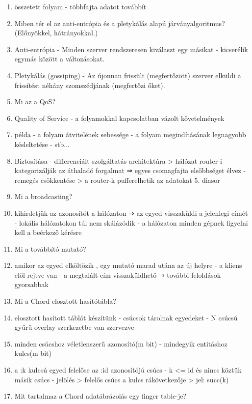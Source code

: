 \documentclass[twoside, a4paper, 12pt]{article}
\begin{document}
\begin{enumerate}
    \item összetett folyam
        - többfajta adatot továbbít
    \item  Miben tér el az anti-entrópia és a pletykálás alapú járványalgoritmus? (Előnyökkel, hátrányokkal.)
    \item Anti-entrópia
        - Minden szerver rendszeresen kiválaszt egy másikat
        - kicserélik egymás között a változásokat.
    \item Pletykálás (gossiping)
        - Az újonnan frissült (megfertőzött) szerver elküldi a frissítést néhány szomszédjának (megfertőzi őket).
    \item  Mi az a QoS?
    \item Quality of Service 
        - a folyamokkal kapcsolatban vázolt követelmények
    \item példa
        - a folyam átvitelének sebessége
        - a folyam megindításának legnagyobb késleltetése
        - stb...
    \item Biztosítása
        - differenciált szolgáltatás architektúra
        > hálózat router-i kategorizálják az áthaladó forgalmat 
        ⇒ egyes csomagfajta elsőbbséget élvez
        - remegés csökkentése
        > a router-k pufferelhetik az adatokat
        5. diasor
    \item  Mi a broadcasting?
    \item kihirdetjük az azonosítót a hálózaton ⇒ az egyed visszaküldi a jelenlegi címét
        - lokális hálózatokon túl nem skálázódik
        - a hálózaton minden gépnek figyelni kell a beérkező kérésre 
    \item  Mi a továbbító mutató?
    \item amikor az egyed elköltözik , egy mutató marad utána az új helyre
        - a kliens elől rejtve van
        - a megtalált cím visszaküldhető ⇒ további feloldások gyorsabbak
    \item  Mi a Chord elosztott hasítótábla?
    \item elosztott hasított táblát készítünk
        - csúcsok tárolnak egyedeket
        - N csúcsú gyűrű overlay szerkezetbe van szervezve
    \item minden csúcshoz véletlenszerű azonosító(m bit)
        - mindegyik entitáshoz kulcs(m bit)
    \item a :k kulcsú egyed felelőse az :id azonosítójú csúcs
        - k <= id és nincs köztük másik csúcs
        - jelölés
        > felelős csúcs a kulcs rákövetkezője
        > jel: succ(k)
    \item  Mit tartalmaz a Chord adatábrázolás egy finger table-je?

\end{enumerate}
\end{document}
